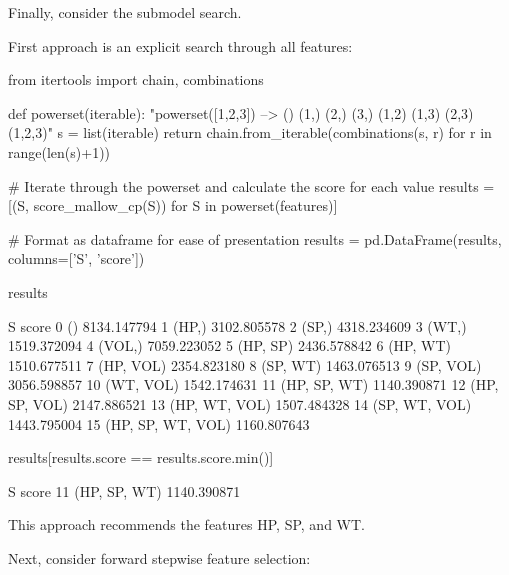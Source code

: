 Finally, consider the submodel search.

First approach is an explicit search through all features:

\begin{python}
from itertools import chain, combinations

def powerset(iterable):
    "powerset([1,2,3]) --> () (1,) (2,) (3,) (1,2) (1,3) (2,3) (1,2,3)"
    s = list(iterable)
    return chain.from_{i}terable(combinations(s, r) for r in range(len(s)+1))
\end{python}

\begin{python}
# Iterate through the powerset and calculate the score for each value
results = [(S, score_mallow_cp(S)) for S in powerset(features)]
    
# Format as dataframe for ease of presentation
results = pd.DataFrame(results, columns=['S', 'score'])
\end{python}

\begin{python}
results
\end{python}

\begin{console}
                    S        score
0                  ()  8134.147794
1               (HP,)  3102.805578
2               (SP,)  4318.234609
3               (WT,)  1519.372094
4              (VOL,)  7059.223052
5            (HP, SP)  2436.578842
6            (HP, WT)  1510.677511
7           (HP, VOL)  2354.823180
8            (SP, WT)  1463.076513
9           (SP, VOL)  3056.598857
10          (WT, VOL)  1542.174631
11       (HP, SP, WT)  1140.390871
12      (HP, SP, VOL)  2147.886521
13      (HP, WT, VOL)  1507.484328
14      (SP, WT, VOL)  1443.795004
15  (HP, SP, WT, VOL)  1160.807643
\end{console}
       
\begin{python}
results[results.score == results.score.min()]
\end{python}

\begin{console}
               S        score
11  (HP, SP, WT)  1140.390871
\end{console}

This approach recommends the features HP, SP, and WT.

Next, consider forward stepwise feature selection:


